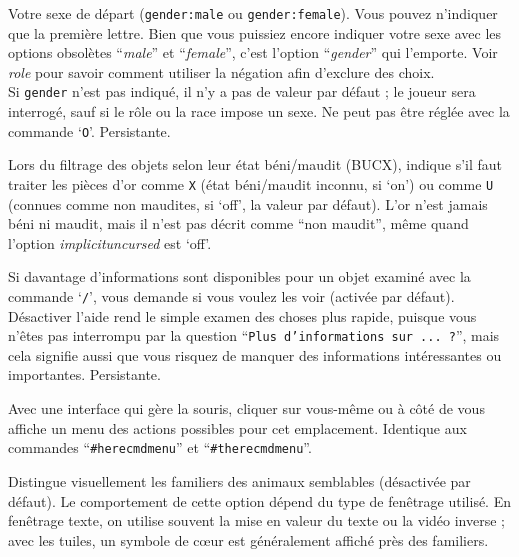 \documentclass[titlepage]{article}
\begin{document}
\begin{description}[font=\mdseries\itshape]
Votre sexe de départ (\texttt{gender:male} ou \texttt{gender:female}).
Vous pouvez n'indiquer que la première lettre.
Bien que vous puissiez
encore indiquer votre sexe avec les options obsolètes
``\textit{male}'' et ``\textit{female}'',
c'est l'option ``\textit{gender}'' qui l'emporte.
Voir \textit{role}
pour savoir comment utiliser la négation afin d'exclure des choix.
\\
Si \texttt{gender} n'est pas indiqué, il n'y a pas de valeur par défaut ;
le joueur sera interrogé, sauf si le rôle ou la race impose un sexe.
Ne peut pas être réglée avec la commande `\texttt{O}'. Persistante.
\item[goldX]
Lors du filtrage des objets selon leur état béni/maudit (BUCX), indique s'il faut
traiter les pièces d'or comme \texttt{X} (état béni/maudit inconnu, si `on')
ou comme \texttt{U} (connues comme non maudites, si `off', la valeur par défaut).
L'or n'est jamais béni ni maudit, mais il n'est pas décrit comme ``non maudit'',
même quand l'option \textit{implicit\textunderscore uncursed} est `off'.
\item[help]
Si davantage d'informations sont disponibles pour un objet examiné
avec la commande `\texttt{/}', vous demande si vous voulez les voir (activée par défaut).
Désactiver l'aide rend le simple examen des choses plus rapide, puisque vous n'êtes pas
interrompu par la question ``\texttt{Plus d'informations sur ... ?}'', mais cela signifie aussi que vous
risquez de manquer des informations intéressantes ou importantes. Persistante.
\item[herecmd\textunderscore menu]
Avec une interface qui gère la souris, cliquer sur vous-même ou
à côté de vous affiche un menu des actions possibles pour cet emplacement.
Identique aux commandes ``\texttt{\#herecmdmenu}'' et ``\texttt{\#therecmdmenu}''.
\item[hilite\textunderscore pet]
Distingue visuellement les familiers des animaux semblables (désactivée par défaut).
Le comportement de cette option dépend du type de fenêtrage utilisé.
En fenêtrage texte, on utilise souvent la mise en valeur du texte ou la vidéo inverse ;
avec les tuiles, un symbole de cœur est généralement affiché près des familiers.


\end{description}
\end{document}
